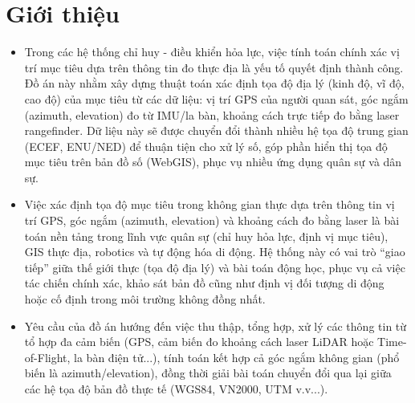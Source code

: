 \section{Giới thiệu}
\begin{itemize}
    \item Trong các hệ thống chỉ huy - điều khiển hỏa lực, việc tính toán chính xác vị trí mục tiêu dựa trên thông tin đo thực địa là yếu tố quyết định thành công. Đồ án này nhằm xây dựng thuật toán xác định tọa độ địa lý (kinh độ, vĩ độ, cao độ) của mục tiêu từ các dữ liệu: vị trí GPS của người quan sát, góc ngắm (azimuth, elevation) đo từ IMU/la bàn, khoảng cách trực tiếp đo bằng laser rangefinder. Dữ liệu này sẽ được chuyển đổi thành nhiều hệ tọa độ trung gian (ECEF, ENU/NED) để thuận tiện cho xử lý số, góp phần hiển thị tọa độ mục tiêu trên bản đồ số (WebGIS), phục vụ nhiều ứng dụng quân sự và dân sự. 
    \item Việc xác định tọa độ mục tiêu trong không gian thực dựa trên thông tin vị trí GPS, góc ngắm (azimuth, elevation) và khoảng cách đo bằng laser là bài toán nền tảng trong lĩnh vực quân sự (chỉ huy hỏa lực, định vị mục tiêu), GIS thực địa, robotics và tự động hóa di động. Hệ thống này có vai trò “giao tiếp” giữa thế giới thực (tọa độ địa lý) và bài toán động học, phục vụ cả việc tác chiến chính xác, khảo sát bản đồ cũng như định vị đối tượng di động hoặc cố định trong môi trường không đồng nhất.
    \item Yêu cầu của đồ án hướng đến việc thu thập, tổng hợp, xử lý các thông tin từ tổ hợp đa cảm biến (GPS, cảm biến đo khoảng cách laser LiDAR hoặc Time-of-Flight, la bàn điện tử...), tính toán kết hợp cả góc ngắm không gian (phổ biến là azimuth/elevation), đồng thời giải bài toán chuyển đổi qua lại giữa các hệ tọa độ bản đồ thực tế (WGS84, VN2000, UTM v.v...).

\end{itemize}


